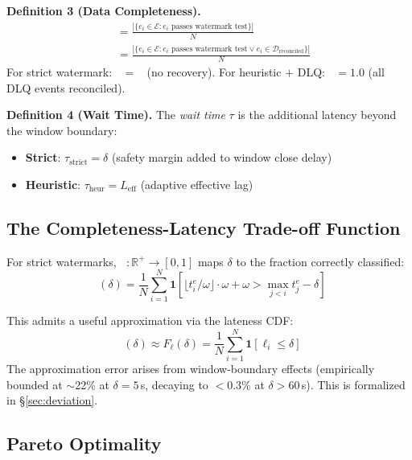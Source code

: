 \documentclass[11pt,a4paper]{article}
\DeclareMathOperator{\Cstrict}{C_{\text{strict}}}
\DeclareMathOperator{\Cimm}{C_{\text{imm}}}
\DeclareMathOperator{\Cev}{C_{\text{ev}}}
\newcommand{\indicator}{\mathbf{1}}
\newcommand{\eventtime}{t^{e}}
\newcommand{\lateness}{\ell}
\newcommand{\Leff}{L_{\text{eff}}}
\begin{document}
\vspace{4pt}
\noindent\textbf{Definition 3 (Data Completeness).}
\begin{align}
  \Cimm &= \frac{|\{e_i \in \mathcal{E} : e_i \text{ passes watermark test}\}|}{N} \label{eq:cimm} \\[4pt]
  \Cev  &= \frac{|\{e_i \in \mathcal{E} : e_i \text{ passes watermark test} \lor e_i \in \mathcal{D}_{\text{reconciled}}\}|}{N} \label{eq:cev}
\end{align}
For strict watermark: $\Cev = \Cimm$ (no recovery).
For heuristic $+$ DLQ: $\Cev = 1.0$ (all DLQ events reconciled).

\vspace{4pt}
\noindent\textbf{Definition 4 (Wait Time).}
The \textit{wait time} $\tau$ is the additional latency beyond the window boundary:
\begin{itemize}[leftmargin=*, itemsep=1pt]
  \item \textbf{Strict}: $\tau_{\text{strict}} = \delta$ (safety margin added to window close delay)
  \item \textbf{Heuristic}: $\tau_{\text{heur}} = \Leff$ (adaptive effective lag)
\end{itemize}

\subsection{The Completeness-Latency Trade-off Function}

For strict watermarks, $\Cstrict: \mathbb{R}^+ \to [0, 1]$ maps $\delta$ to the fraction correctly classified:
\begin{equation}
  \Cstrict(\delta) = \frac{1}{N} \sum_{i=1}^{N} \indicator\!\left[ \big\lfloor \eventtime_i / \omega \big\rfloor \cdot \omega + \omega > \max_{j < i} \eventtime_j - \delta \right]
  \label{eq:cstrict}
\end{equation}

This admits a useful approximation via the lateness CDF:
\begin{equation}
  \Cstrict(\delta) \approx F_\ell(\delta) = \frac{1}{N} \sum_{i=1}^{N} \indicator[\lateness_i \leq \delta]
  \label{eq:approx}
\end{equation}
The approximation error arises from window-boundary effects (empirically bounded at $\sim$22\% at $\delta{=}5$\,s, decaying to $<$0.3\% at $\delta{>}60$\,s). This is formalized in \S\ref{sec:deviation}.

\subsection{Pareto Optimality}
\end{document}
